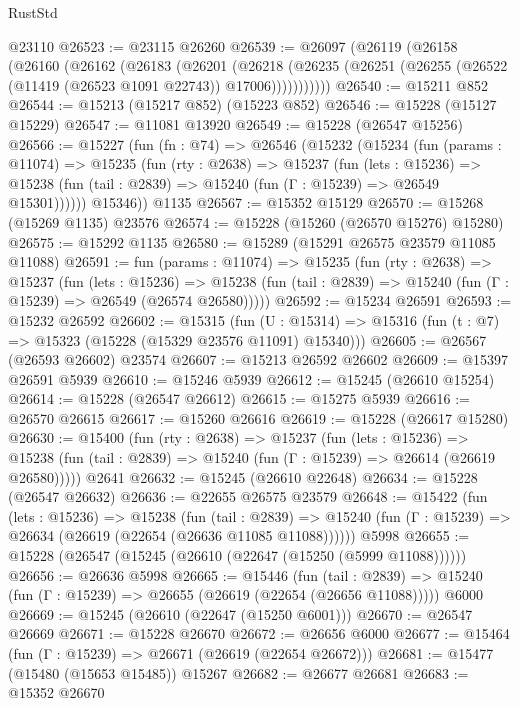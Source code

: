 \begin{lexlean}{RustStd}
\begin{coremodule}
    @23110
@26523 := @23115 @26260
@26539 := @26097
    (@26119
      (@26158
        (@26160
          (@26162
            (@26183
              (@26201
                (@26218
                  (@26235 (@26251 (@26255 (@26522 (@11419 (@26523 @1091 @22743)) @17006)))))))))))
@26540 := @15211 @852
@26544 := @15213 (@15217 @852) (@15223 @852)
@26546 := @15228 (@15127 @15229)
@26547 := @11081 @13920
@26549 := @15228 (@26547 @15256)
@26566 := @15227
    (fun (fn : @74) =>
    @26546
      (@15232
        (@15234
          (fun (params : @11074) =>
          @15235
            (fun (rty : @2638) =>
            @15237
              (fun (lets : @15236) =>
              @15238 (fun (tail : @2839) => @15240 (fun (Γ : @15239) => @26549 @15301))))))
        @15346))
    @1135
@26567 := @15352 @15129
@26570 := @15268 (@15269 @1135) @23576
@26574 := @15228 (@15260 (@26570 @15276) @15280)
@26575 := @15292 @1135
@26580 := @15289 (@15291 @26575 @23579 @11085 @11088)
@26591 := fun (params : @11074) =>
  @15235
    (fun (rty : @2638) =>
    @15237
      (fun (lets : @15236) =>
      @15238 (fun (tail : @2839) => @15240 (fun (Γ : @15239) => @26549 (@26574 @26580)))))
@26592 := @15234 @26591
@26593 := @15232 @26592
@26602 := @15315
    (fun (U : @15314) => @15316 (fun (t : @7) => @15323 (@15228 (@15329 @23576 @11091) @15340)))
@26605 := @26567 (@26593 @26602) @23574
@26607 := @15213 @26592 @26602
@26609 := @15397 @26591 @5939
@26610 := @15246 @5939
@26612 := @15245 (@26610 @15254)
@26614 := @15228 (@26547 @26612)
@26615 := @15275 @5939
@26616 := @26570 @26615
@26617 := @15260 @26616
@26619 := @15228 (@26617 @15280)
@26630 := @15400
    (fun (rty : @2638) =>
    @15237
      (fun (lets : @15236) =>
      @15238 (fun (tail : @2839) => @15240 (fun (Γ : @15239) => @26614 (@26619 @26580)))))
    @2641
@26632 := @15245 (@26610 @22648)
@26634 := @15228 (@26547 @26632)
@26636 := @22655 @26575 @23579
@26648 := @15422
    (fun (lets : @15236) =>
    @15238
      (fun (tail : @2839) =>
      @15240 (fun (Γ : @15239) => @26634 (@26619 (@22654 (@26636 @11085 @11088))))))
    @5998
@26655 := @15228 (@26547 (@15245 (@26610 (@22647 (@15250 (@5999 @11088))))))
@26656 := @26636 @5998
@26665 := @15446
    (fun (tail : @2839) => @15240 (fun (Γ : @15239) => @26655 (@26619 (@22654 (@26656 @11088)))))
    @6000
@26669 := @15245 (@26610 (@22647 (@15250 @6001)))
@26670 := @26547 @26669
@26671 := @15228 @26670
@26672 := @26656 @6000
@26677 := @15464 (fun (Γ : @15239) => @26671 (@26619 (@22654 @26672)))
@26681 := @15477 (@15480 (@15653 @15485)) @15267
@26682 := @26677 @26681
@26683 := @15352 @26670

\end{coremodule}
\end{lexlean}
